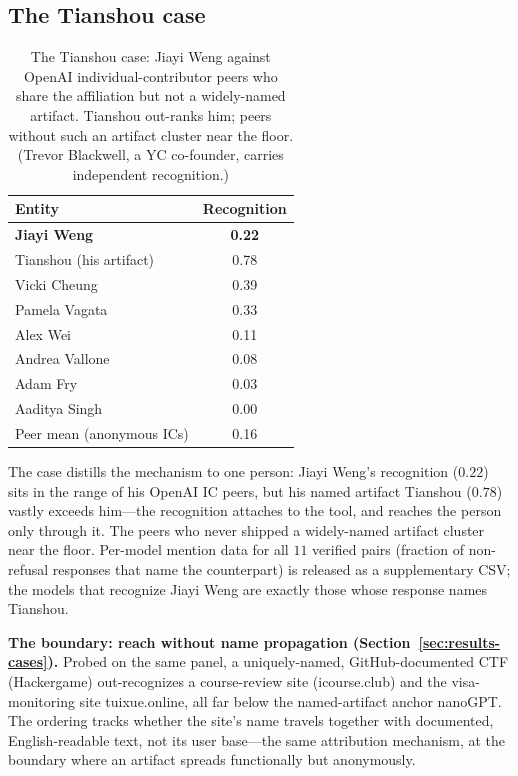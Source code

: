 \subsection{The Tianshou case}

\begin{table}[!htbp]
\centering
\small
\caption{The Tianshou case: Jiayi Weng against OpenAI individual-contributor peers who share the affiliation but not a widely-named artifact. Tianshou out-ranks him; peers without such an artifact cluster near the floor. (Trevor Blackwell, a YC co-founder, carries independent recognition.)}
\label{tab:tianshou-case}
\begin{tabular}{lc}
\toprule
Entity & Recognition \\
\midrule
\textbf{Jiayi Weng} & \textbf{0.22} \\
\quad Tianshou (his artifact) & 0.78 \\
\midrule
Vicki Cheung & 0.39 \\
Pamela Vagata & 0.33 \\
Alex Wei & 0.11 \\
Andrea Vallone & 0.08 \\
Adam Fry & 0.03 \\
Aaditya Singh & 0.00 \\
\midrule
Peer mean (anonymous ICs) & 0.16 \\
\bottomrule
\end{tabular}
\end{table}

The case distills the mechanism to one person: Jiayi Weng's recognition ($0.22$) sits in the range of his OpenAI IC peers, but his named artifact Tianshou ($0.78$) vastly exceeds him---the recognition attaches to the tool, and reaches the person only through it. The peers who never shipped a widely-named artifact cluster near the floor. Per-model mention data for all $11$ verified pairs (fraction of non-refusal responses that name the counterpart) is released as a supplementary CSV; the models that recognize Jiayi Weng are exactly those whose response names Tianshou.

\textbf{The boundary: reach without name propagation (Section~\ref{sec:results-cases}).} Probed on the same panel, a uniquely-named, GitHub-documented CTF (Hackergame) out-recognizes a course-review site (icourse.club) and the visa-monitoring site tuixue.online, all far below the named-artifact anchor nanoGPT. The ordering tracks whether the site's name travels together with documented, English-readable text, not its user base---the same attribution mechanism, at the boundary where an artifact spreads functionally but anonymously.

